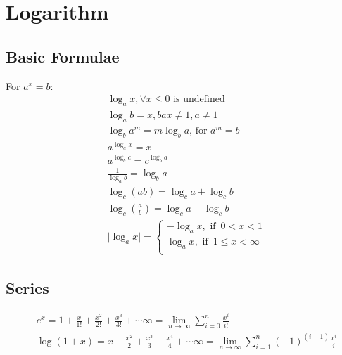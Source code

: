 \documentclass[../main.tex]{subfiles}
\begin{document}
	\chapter{Logarithm}
	\section{Basic Formulae}
	For $a^x=b$:
	\begin{align}
		& \log_{a}{x}, \forall x \leq 0 \text{ is undefined}\\
		& \log_a b = x, bax \neq 1, a \neq 1\\
		& \log_b a^m = m \log_b a \text{, for } a^m=b\\
		& a^{\log_a x} = x\\
		& a^{\log_b c} = c^{\log_b a}\\
		& \frac{1}{\log_a b} = \log_b a\\
		& \log_c (ab) = \log_c a+\log_c b\\
		& \log_c \left( \frac{a}{b} \right) = \log_c a-\log_c b\\
		& \vert \log_a x \vert=\begin{cases}
			-\log_a x, \text{ if } \, 0 < x < 1\\
			\log_a x, \text{ if } \, 1\leq x < \infty \\
		\end{cases}
	\end{align}
	
	\section{Series}
	\begin{align}
		& e^x = 1 + \frac{x}{1!} + \frac{x^2}{2!} + \frac{x^3}{3!} + \cdots \infty = \lim_{n \to \infty} \sum_{i=0}^{n} \frac{x^i}{i!} \\
		& \log(1+x) = x - \frac{x^2}{2} + \frac{x^3}{3} - \frac{x^4}{4} + \cdots \infty = \lim_{n\to\infty} \sum_{i=1}^{n}(-1)^{(i-1)} \frac{x^i}{i}
	\end{align}
\end{document}
